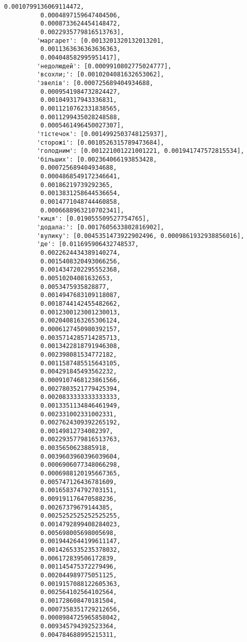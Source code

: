 \documentclass[11pt]{article}
\begin{document}
\begin{Verbatim}[commandchars=\\\{\}]
          0.0010799136069114472,
          0.0004897159647404506,
          0.0008733624454148472,
          0.0022935779816513763],
         'маргарет': [0.0013201320132013201,
          0.0011363636363636363,
          0.004048582995951417],
         'недолюдей': [0.0009910802775024777],
         'всохли;': [0.0010204081632653062],
         'звелів': [0.000725689404934688,
          0.0009541984732824427,
          0.001049317943336831,
          0.0011210762331838565,
          0.0011299435028248588,
          0.0005461496450027307],
         'тістечок': [0.0014992503748125937],
         'сторожі': [0.0010526315789473684],
         'голодним': [0.001221001221001221, 0.001941747572815534],
         'більших': [0.002364066193853428,
          0.000725689404934688,
          0.0004868549172346641,
          0.00186219739292365,
          0.0013831258644536654,
          0.0014771048744460858,
          0.0006688963210702341],
         'киця': [0.019055509527754765],
         'додала:': [0.0017605633802816902],
         'вулику': [0.0045351473922902496, 0.0009861932938856016],
         'де': [0.011695906432748537,
          0.0022624434389140274,
          0.0015408320493066256,
          0.0014347202295552368,
          0.00510204081632653,
          0.0053475935828877,
          0.0014947683109118087,
          0.0018744142455482662,
          0.0012300123001230013,
          0.0020408163265306124,
          0.0006127450980392157,
          0.0035714285714285713,
          0.0013422818791946308,
          0.002398081534772182,
          0.0011587485515643105,
          0.004291845493562232,
          0.0009107468123861566,
          0.0027803521779425394,
          0.0020833333333333333,
          0.0013351134846461949,
          0.002331002331002331,
          0.0027624309392265192,
          0.00149812734082397,
          0.0022935779816513763,
          0.0035650623885918,
          0.0039603960396039604,
          0.0006906077348066298,
          0.0006988120195667365,
          0.005747126436781609,
          0.001658374792703151,
          0.009191176470588236,
          0.00267379679144385,
          0.0025252525252525255,
          0.0014792899408284023,
          0.005698005698005698,
          0.0019442644199611147,
          0.0014265335235378032,
          0.006172839506172839,
          0.001145475372279496,
          0.002044989775051125,
          0.0019157088122605363,
          0.002564102564102564,
          0.001728608470181504,
          0.0007358351729212656,
          0.0008984725965858042,
          0.009345794392523364,
          0.004784688995215311,

\end{Verbatim}
\end{document}
